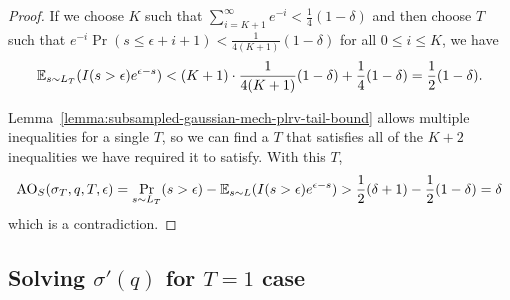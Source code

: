 \documentclass{article}
\theoremstyle{plain}
\theoremstyle{definition}
\theoremstyle{remark}
\begin{document}
\begin{proof}
    If we choose $K$ such that $\sum_{i=K+1}^\infty e^{-i} < \frac{1}{4}(1 - \delta)$ and then choose $T$ such that 
    $e^{-i}\Pr(s \leq \epsilon + i + 1) < \frac{1}{4(K+1)}(1 - \delta)$ for all $0 \leq i \leq K$, we have 
    \begin{equation}
        \operatorname{\mathbb{E}}_{s\sim L_T}(I(s > \epsilon)e^{\epsilon - s}) 
        < (K+1)\cdot \frac{1}{4(K+1)}(1 - \delta) + \frac{1}{4}(1 - \delta)
        = \frac{1}{2}(1 - \delta).
    \end{equation}

    Lemma~\ref{lemma:subsampled-gaussian-mech-plrv-tail-bound} allows multiple inequalities for a
    single $T$, so we can find a $T$ that satisfies all of the $K + 2$ inequalities we have required it to 
    satisfy. With this $T$,
    \begin{equation}
        \mathrm{AO}_S(\sigma_T, q, T, \epsilon) 
        = \Pr_{s\sim L_T}(s > \epsilon) - \operatorname{\mathbb{E}}_{s\sim L}(I(s > \epsilon)e^{\epsilon - s})
        > \frac{1}{2}(\delta + 1) - \frac{1}{2}(1 - \delta)
        = \delta
    \end{equation}
    which is a contradiction.
\end{proof}

\subsection{Solving $\sigma'(q)$ for $T=1$ case}
\label{sec:app-sigma-derivative}
\end{document}
